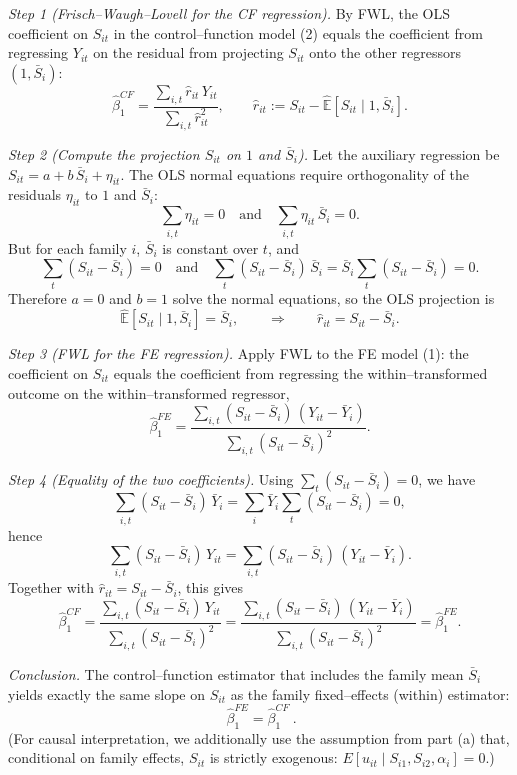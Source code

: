 \documentclass[12pt]{article}
\begin{document}
\begin{enumerate}[label=\textbf{(\alph*)}, leftmargin=1.5em]
    \medskip
    \textit{Step 1 (Frisch–Waugh–Lovell for the CF regression).}
    By FWL, the OLS coefficient on $S_{it}$ in the control–function model (2) equals the coefficient from regressing $Y_{it}$ on the residual from projecting $S_{it}$ onto the other regressors $(1,\bar S_i)$:
    \[
    \hat\beta^{CF}_1
    =\frac{\sum_{i,t} \hat r_{it}\,Y_{it}}{\sum_{i,t}\hat r_{it}^2},
    \qquad
    \hat r_{it}:=S_{it}-\widehat{\mathbb E}[S_{it}\mid 1,\bar S_i].
    \]

    \textit{Step 2 (Compute the projection $S_{it}$ on $1$ and $\bar S_i$).}
    Let the auxiliary regression be $S_{it}=a+b\,\bar S_i + \eta_{it}$. The OLS normal equations require orthogonality of the residuals $\eta_{it}$ to $1$ and $\bar S_i$:
    \[
    \sum_{i,t}\eta_{it}=0
    \quad\text{and}\quad
    \sum_{i,t}\eta_{it}\,\bar S_i=0.
    \]
    But for each family $i$, $\bar S_i$ is constant over $t$, and
    \[
    \sum_{t}(S_{it}-\bar S_i)=0
    \quad\text{and}\quad
    \sum_{t}(S_{it}-\bar S_i)\,\bar S_i=\bar S_i\sum_{t}(S_{it}-\bar S_i)=0.
    \]
    Therefore $a=0$ and $b=1$ solve the normal equations, so the OLS projection is
    \[
    \widehat{\mathbb E}[S_{it}\mid 1,\bar S_i]=\bar S_i,
    \qquad\Rightarrow\qquad
    \hat r_{it}=S_{it}-\bar S_i.
    \]

    \textit{Step 3 (FWL for the FE regression).}
    Apply FWL to the FE model (1): the coefficient on $S_{it}$ equals the coefficient from regressing the within–transformed outcome on the within–transformed regressor,
    \[
    \hat\beta^{FE}_1
    =\frac{\sum_{i,t}(S_{it}-\bar S_i)\,(Y_{it}-\bar Y_i)}{\sum_{i,t}(S_{it}-\bar S_i)^2}.
    \]

    \textit{Step 4 (Equality of the two coefficients).}
    Using $\sum_t(S_{it}-\bar S_i)=0$, we have
    \[
    \sum_{i,t}(S_{it}-\bar S_i)\,\bar Y_i
    =\sum_i \bar Y_i \sum_t (S_{it}-\bar S_i)=0,
    \]
    hence
    \[
    \sum_{i,t}(S_{it}-\bar S_i)\,Y_{it}
    =\sum_{i,t}(S_{it}-\bar S_i)\,(Y_{it}-\bar Y_i).
    \]
    Together with $\hat r_{it}=S_{it}-\bar S_i$, this gives
    \[
    \hat\beta^{CF}_1
    =\frac{\sum_{i,t}(S_{it}-\bar S_i)\,Y_{it}}{\sum_{i,t}(S_{it}-\bar S_i)^2}
    =\frac{\sum_{i,t}(S_{it}-\bar S_i)\,(Y_{it}-\bar Y_i)}{\sum_{i,t}(S_{it}-\bar S_i)^2}
    =\hat\beta^{FE}_1.
    \]

  \textit{Conclusion.}  The control–function estimator that includes the family mean $\bar S_i$ yields exactly the same slope on $S_{it}$ as the family fixed–effects (within) estimator:
    \[
    \boxed{\ \hat\beta^{FE}_1=\hat\beta^{CF}_1\ }.
    \]
  (For causal interpretation, we additionally use the assumption from part (a) that, conditional on family effects, $S_{it}$ is strictly exogenous: $E[u_{it}\mid S_{i1},S_{i2},\alpha_i]=0$.)


\end{enumerate}
\end{document}
